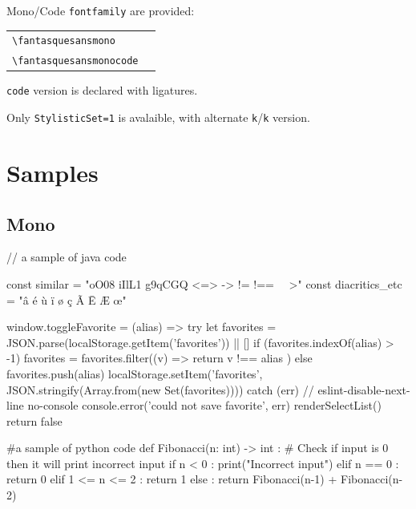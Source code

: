 \documentclass[a4paper]{scrartcl}
\newcommand*{\opt}[1]{\texttt{#1}}
\newcommand*{\cmd}[1]{\texttt{\textbackslash #1}}\newcommand*{\showtchar}[1]{\cmd{#1}~\csname #1\endcsname}
\newcommand\samplettxt{oO08 iIlL1 g9qCGQ <=> -> != !== \string~\string~>}
\newcommand\samplett[1][]{\cmd{#1} & \fbox{\csname#1\endcsname\samplettxt} \\}
\begin{document}
Mono/Code \opt{fontfamily} are provided:

\begin{tabular}{ll}
	\samplett[fantasquesansmono]
	\samplett[fantasquesansmonocode]
\end{tabular}

\opt{code} version is declared with ligatures.

\smallskip

Only \opt{StylisticSet={1}} is avalaible, with alternate \opt{k}/\opt{k} version.

\section{Samples}

\subsection{Mono}


\begin{codeblock}[minted language=java, title=Sample java code]
// a sample of java code

const similar = "oO08 iIlL1 g9qCGQ <=> -> != !== ~~>"
const diacritics_etc = "â é ù ï ø ç Ã Ē Æ œ"

window.toggleFavorite = (alias) => {
  try {
    let favorites = JSON.parse(localStorage.getItem('favorites')) || []
    if (favorites.indexOf(alias) > -1) {
      favorites = favorites.filter((v) => {
        return v !== alias
      })
    } else {
      favorites.push(alias)
    }
    localStorage.setItem('favorites', JSON.stringify(Array.from(new Set(favorites))))
  } catch (err) {
    // eslint-disable-next-line no-console
    console.error('could not save favorite', err)
  }
  renderSelectList()
  return false
}
\end{codeblock}

\begin{codeblock}[minted language=python3, title=Sample python code]
#a sample of python code
def Fibonacci(n: int) -> int :
  # Check if input is 0 then it will print incorrect input
  if n < 0 :
    print("Incorrect input")
  elif n == 0 :
    return 0
  elif 1 <= n <= 2 :
    return 1
  else :
    return Fibonacci(n-1) + Fibonacci(n-2)
\end{codeblock}
\end{document}
